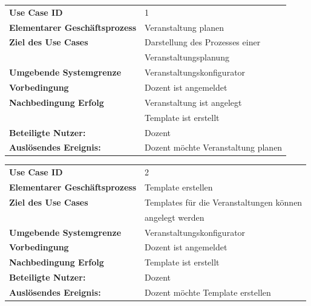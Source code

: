 	\begin{table}[H]
	\begin{tabular}{|ll}
	 \rowcolor{hellgrau}\textbf{Use Case ID} & 1 \\
 	 \textbf{Elementarer Geschäftsprozess} &  Veranstaltung planen \\ 
	 \textbf{Ziel des Use Cases} & Darstellung des  Prozesses einer    \\
	 & Veranstaltungsplanung\\ 
	 \textbf{Umgebende Systemgrenze}& Veranstaltungskonfigurator \\ 
	 \textbf{Vorbedingung} & Dozent ist angemeldet \\ 
	 \textbf{Nachbedingung Erfolg} & Veranstaltung ist angelegt \\ 
	 & Template ist erstellt\\
	 \textbf{Beteiligte Nutzer:} & Dozent \\ 
     \textbf{Auslösendes Ereignis:} & Dozent möchte Veranstaltung planen \\ 
	 
	\end{tabular} 
	\label{tab:usecase_1}
	\end{table}
	
		\begin{table}[H]
		\begin{tabular}{|ll}
		  \rowcolor{hellgrau}\textbf{Use Case ID} & 2 \\
	 	 \textbf{Elementarer Geschäftsprozess} &  Template erstellen \\ 
		 \textbf{Ziel des Use Cases} & Templates für die Veranstaltungen können \\& angelegt werden   \\
		 \textbf{Umgebende Systemgrenze}& Veranstaltungskonfigurator \\ 
		 \textbf{Vorbedingung} & Dozent ist angemeldet \\ 
		 \textbf{Nachbedingung Erfolg} & Template ist erstellt \\ 
		 \textbf{Beteiligte Nutzer:} & Dozent \\ 
	     \textbf{Auslösendes Ereignis:} & Dozent möchte Template erstellen \\ 
		 
		\end{tabular} 
		\label{tab:usecase_2}
		\end{table}
	
